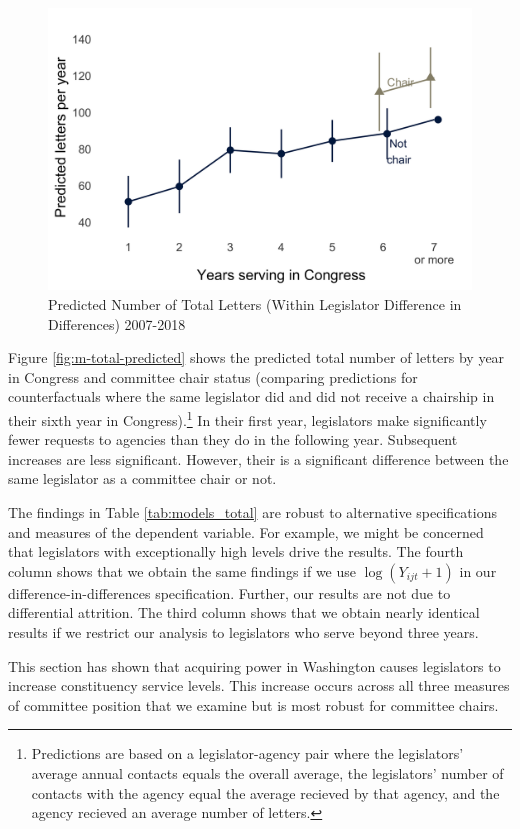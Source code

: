 \documentclass[12pt]{article}
\begin{document}
\begin{figure}[hbt!]
\centering
\caption{Predicted Number of Total Letters (Within Legislator Difference in Differences) 2007-2018} \label{f:m-total-predicted}
\includegraphics[width = .8\textwidth]{figs/m-total-predicted-4}
\end{figure}

Figure \ref{fig:m-total-predicted} shows the predicted total number of letters by year in Congress and committee chair status (comparing predictions for counterfactuals where the same legislator did and did not receive a chairship in their sixth year in Congress).\footnote{Predictions are based on a legislator-agency pair where the legislators' average annual contacts equals the overall average, the legislators' number of contacts with the agency equal the average recieved by that agency, and the agency recieved an average number of letters.} In their first year, legislators make significantly fewer requests to agencies than they do in the following year. Subsequent increases are less significant. However, their is a significant difference between the same legislator as a committee chair or not.

The findings in Table \ref{tab:models_total} are robust to alternative specifications and measures of the dependent variable. For example, we might be concerned that legislators with exceptionally high levels drive the results. The fourth column shows that we obtain the same findings if we use $\log (Y_{ijt} + 1)$ in our difference-in-differences specification. Further, our results are not due to differential attrition. The third column shows that we obtain nearly identical results if we restrict our analysis to legislators who serve beyond three years.    

This section has shown that acquiring power in Washington causes legislators to increase constituency service levels. This increase occurs across all three measures of committee position that we examine but is most robust for committee chairs. 
\end{document}
